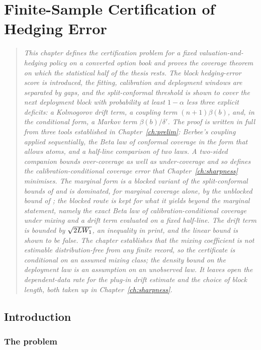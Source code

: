 \documentclass[../../../main.tex]{subfiles}
\begin{document}
\chapter{Finite-Sample Certification of Hedging Error}\label{ch:cert}\label{ch:certification}

\begin{quote}\itshape
This chapter defines the certification problem for a fixed valuation-and-hedging policy on a converted option book and proves the coverage theorem on which the statistical half of the thesis rests. The block hedging-error score is introduced, the fitting, calibration and deployment windows are separated by gaps, and the split-conformal threshold is shown to cover the next deployment block with probability at least $1-\alpha$ less three explicit deficits: a Kolmogorov drift term, a coupling term $(n+1)\beta(b)$, and, in the conditional form, a Markov term $\beta(b)/\delta'$. The proof is written in full from three tools established in Chapter~\ref{ch:prelim}: Berbee's coupling applied sequentially, the Beta law of conformal coverage in the form that allows atoms, and a half-line comparison of two laws. A two-sided companion bounds over-coverage as well as under-coverage and so defines the calibration-conditional coverage error that Chapter~\ref{ch:sharpness} minimises. The marginal form is a blocked variant of the split-conformal bounds of \cite{oliveira2024} and is dominated, for marginal coverage alone, by the unblocked bound of \cite{barber2026}; the blocked route is kept for what it yields beyond the marginal statement, namely the exact Beta law of calibration-conditional coverage under mixing and a drift term evaluated on a fixed half-line. The drift term is bounded by $\sqrt{2LW_1}$, an inequality in print, and the linear bound is shown to be false. The chapter establishes that the mixing coefficient is not estimable distribution-free from any finite record, so the certificate is conditional on an assumed mixing class; the density bound on the deployment law is an assumption on an unobserved law. It leaves open the dependent-data rate for the plug-in drift estimate and the choice of block length, both taken up in Chapter~\ref{ch:sharpness}.
\end{quote}

\section{Introduction}\label{sec:cert-intro}

\subsection{The problem}
\end{document}
